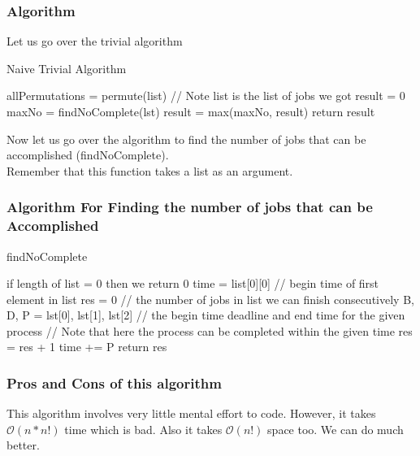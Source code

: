\documentclass[11pt]{article}
\begin{document}
{				\subsubsection{Algorithm}
				Let us go over the trivial algorithm
				\begin{algorithm}
					\caption{Naive Trivial Algorithm}
					\begin{algorithmic}[1] 
						\STATE allPermutations = permute(list) // Note list is the list of jobs we got
						\STATE result = 0
						\STATE maxNo = findNoComplete(lst)
						\STATE result = max(maxNo, result)
						\ENDFOR
						\STATE return result
					\end{algorithmic}
				\end{algorithm}
				
				Now let us go over the algorithm to find the number of jobs that can be accomplished (findNoComplete).\\
				Remember that this function takes a list as an argument.
				
				\subsubsection{Algorithm For Finding the number of jobs that can be Accomplished}
				\phantom{This text will be invisible}
				
				\begin{algorithm}
					\caption{findNoComplete}
					\begin{algorithmic}[1] 
						\STATE if length of list = 0 then we return 0
						\STATE time = list[0][0] // begin time of first element in list
						\STATE res = 0 // the number of jobs in list we can finish consecutively
						\FOR{lst in list}
						\STATE B, D, P = lst[0], lst[1], lst[2] // the begin time deadline and end time for the given process
						\IF{time + P $<$ D }
						\STATE // Note that here the process can be completed within the given time
						\STATE res = res + 1
						time += P
						\ENDIF
						\ENDFOR
						\STATE return res
					\end{algorithmic}
				\end{algorithm}
				
				\subsubsection{Pros and Cons of this algorithm}
				This algorithm involves very little mental effort to code. However, it takes $\mathcal{O}(n*n!)$ time which is bad. Also it takes $\mathcal{O}(n!)$ space too. We can do much better.
				
}
\end{document}
